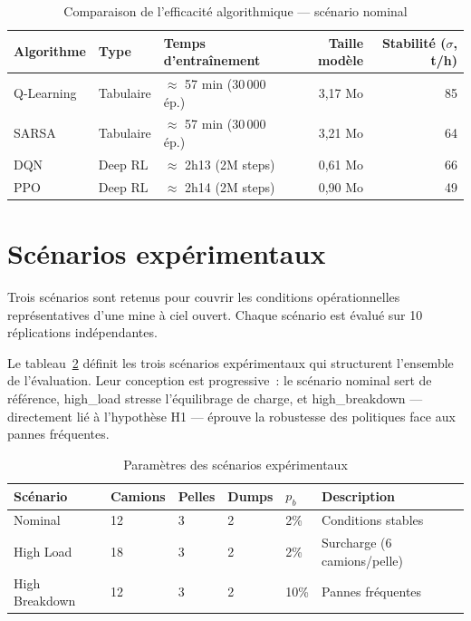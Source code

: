 \documentclass[11pt,a4paper]{report}
\begin{document}
\begin{table}[H]
\centering
\caption{Comparaison de l'efficacité algorithmique — scénario nominal}
\label{tab:efficacite-algo}
\begin{tabular}{lllrr}
\toprule
\textbf{Algorithme} & \textbf{Type} & \textbf{Temps d'entraînement} & \textbf{Taille modèle} & \textbf{Stabilité ($\sigma$, t/h)} \\
\midrule
Q-Learning & Tabulaire & $\approx$ 57 min (30\,000 ép.) & 3,17 Mo & 85 \\
SARSA      & Tabulaire & $\approx$ 57 min (30\,000 ép.) & 3,21 Mo & 64 \\
DQN        & Deep RL   & $\approx$ 2h13 (2M steps)      & 0,61 Mo & 66 \\
PPO        & Deep RL   & $\approx$ 2h14 (2M steps)      & 0,90 Mo & 49 \\
\bottomrule
\end{tabular}
\end{table}

\section{Scénarios expérimentaux}
\label{sec:scenarios}

Trois scénarios sont retenus pour couvrir les conditions opérationnelles représentatives d'une mine à ciel ouvert.  Chaque scénario est évalué sur 10 réplications indépendantes.

Le tableau~\ref{tab:scenarios} d\'efinit les trois sc\'enarios exp\'erimentaux qui structurent l'ensemble de l'\'evaluation. Leur conception est progressive~: le sc\'enario nominal sert de r\'ef\'erence, high\_load stresse l'\'equilibrage de charge, et high\_breakdown --- directement li\'e \`a l'hypoth\`ese H1 --- \'eprouve la robustesse des politiques face aux pannes fr\'equentes.

\begin{table}[H]
\centering
\caption{Paramètres des scénarios expérimentaux}
\label{tab:scenarios}
\begin{tabular}{llllll}
\toprule
\textbf{Scénario} & \textbf{Camions} & \textbf{Pelles} & \textbf{Dumps} & \textbf{$p_b$} & \textbf{Description} \\
\midrule
Nominal       & 12 & 3 & 2 & 2\%  & Conditions stables \\
High Load     & 18 & 3 & 2 & 2\%  & Surcharge (6 camions/pelle) \\
High Breakdown& 12 & 3 & 2 & 10\% & Pannes fréquentes \\
\bottomrule
\end{tabular}
\end{table}
\end{document}
